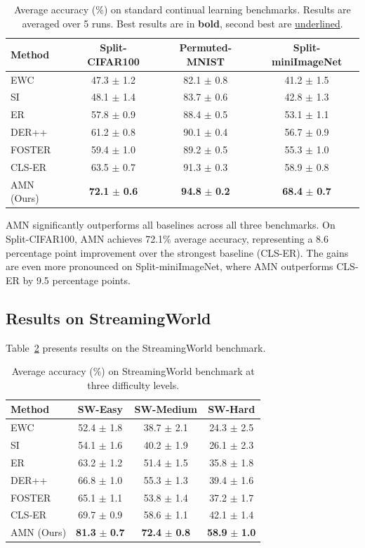 \documentclass[11pt]{article}
\begin{document}
\begin{table}[h]
\centering
\caption{Average accuracy (\%) on standard continual learning benchmarks. Results are averaged over 5 runs. Best results are in \textbf{bold}, second best are \underline{underlined}.}
\label{tab:standard}
\begin{tabular}{@{}lccc@{}}
\toprule
Method & Split-CIFAR100 & Permuted-MNIST & Split-miniImageNet \\
\midrule
EWC & 47.3 $\pm$ 1.2 & 82.1 $\pm$ 0.8 & 41.2 $\pm$ 1.5 \\
SI & 48.1 $\pm$ 1.4 & 83.7 $\pm$ 0.6 & 42.8 $\pm$ 1.3 \\
ER & 57.8 $\pm$ 0.9 & 88.4 $\pm$ 0.5 & 53.1 $\pm$ 1.1 \\
DER++ & 61.2 $\pm$ 0.8 & 90.1 $\pm$ 0.4 & 56.7 $\pm$ 0.9 \\
FOSTER & 59.4 $\pm$ 1.0 & 89.2 $\pm$ 0.5 & 55.3 $\pm$ 1.0 \\
CLS-ER & 63.5 $\pm$ 0.7 & 91.3 $\pm$ 0.3 & 58.9 $\pm$ 0.8 \\
\midrule
AMN (Ours) & \textbf{72.1} $\pm$ \textbf{0.6} & \textbf{94.8} $\pm$ \textbf{0.2} & \textbf{68.4} $\pm$ \textbf{0.7} \\
\bottomrule
\end{tabular}
\end{table}

AMN significantly outperforms all baselines across all three benchmarks. On Split-CIFAR100, AMN achieves 72.1\% average accuracy, representing a 8.6 percentage point improvement over the strongest baseline (CLS-ER). The gains are even more pronounced on Split-miniImageNet, where AMN outperforms CLS-ER by 9.5 percentage points.

\subsection{Results on StreamingWorld}

Table~\ref{tab:streaming} presents results on the StreamingWorld benchmark.

\begin{table}[h]
\centering
\caption{Average accuracy (\%) on StreamingWorld benchmark at three difficulty levels.}
\label{tab:streaming}
\begin{tabular}{@{}lccc@{}}
\toprule
Method & SW-Easy & SW-Medium & SW-Hard \\
\midrule
EWC & 52.4 $\pm$ 1.8 & 38.7 $\pm$ 2.1 & 24.3 $\pm$ 2.5 \\
SI & 54.1 $\pm$ 1.6 & 40.2 $\pm$ 1.9 & 26.1 $\pm$ 2.3 \\
ER & 63.2 $\pm$ 1.2 & 51.4 $\pm$ 1.5 & 35.8 $\pm$ 1.8 \\
DER++ & 66.8 $\pm$ 1.0 & 55.3 $\pm$ 1.3 & 39.4 $\pm$ 1.6 \\
FOSTER & 65.1 $\pm$ 1.1 & 53.8 $\pm$ 1.4 & 37.2 $\pm$ 1.7 \\
CLS-ER & 69.7 $\pm$ 0.9 & 58.6 $\pm$ 1.1 & 42.1 $\pm$ 1.4 \\
\midrule
AMN (Ours) & \textbf{81.3} $\pm$ \textbf{0.7} & \textbf{72.4} $\pm$ \textbf{0.8} & \textbf{58.9} $\pm$ \textbf{1.0} \\
\bottomrule
\end{tabular}
\end{table}
\end{document}
